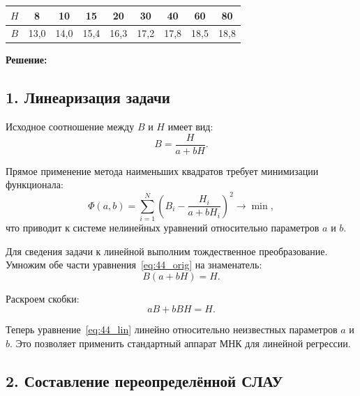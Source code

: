\documentclass{article}
\begin{document}
\begin{center}
\begin{tabular}{|c|c|c|c|c|c|c|c|c|}
\hline
$H$ & 8 & 10 & 15 & 20 & 30 & 40 & 60 & 80 \\
\hline
$B$ & 13,0 & 14,0 & 15,4 & 16,3 & 17,2 & 17,8 & 18,5 & 18,8 \\
\hline
\end{tabular}
\end{center}

\vspace{0.5cm}
\textbf{Решение:}

\subsection*{1. Линеаризация задачи}

Исходное соотношение между $B$ и $H$ имеет вид:
\begin{equation}
B = \frac{H}{a + bH}.
\label{eq:44_orig}
\end{equation}

Прямое применение метода наименьших квадратов требует минимизации функционала:
\begin{equation}
\Phi(a, b) = \sum_{i=1}^{N} \left(B_i - \frac{H_i}{a + bH_i}\right)^2 \to \min,
\end{equation}
что приводит к системе нелинейных уравнений относительно параметров $a$ и $b$.

Для сведения задачи к линейной выполним тождественное преобразование. Умножим обе части уравнения~\eqref{eq:44_orig} на знаменатель:
\begin{equation}
B(a + bH) = H.
\end{equation}

Раскроем скобки:
\begin{equation}
aB + bBH = H.
\label{eq:44_lin}
\end{equation}

Теперь уравнение~\eqref{eq:44_lin} линейно относительно неизвестных параметров $a$ и $b$. Это позволяет применить стандартный аппарат МНК для линейной регрессии.

\subsection*{2. Составление переопределённой СЛАУ}
\end{document}
